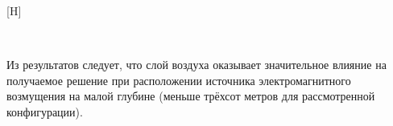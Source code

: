 \documentclass[a4paper,14pt]{article}
\makeatletter
\renewenvironment{figure}[1][\fps@figure]{
  \edef\@tempa{\noexpand\@float{figure}[#1]}
  \@tempa
  \addtocounter{foofigure}{1}
}{
  \end@float
}
\renewcommand{\Re}{\mathop{\mathrm{Re}}\nolimits}
\makeatother
\begin{document}
\begin{figure}[H]
	\centering
	~
	\caption{$\Re(\mathbf{E}_y)$ по линии $y=0$, $z=-610$, глубина (а) 200 м и (б) 300 м}
	\label{fig:res1:200_300}
\end{figure}

Из результатов следует, что слой воздуха оказывает значительное влияние на получаемое решение при расположении источника электромагнитного возмущения на малой глубине (меньше трёхсот метров для рассмотренной конфигурации).

\end{document}
